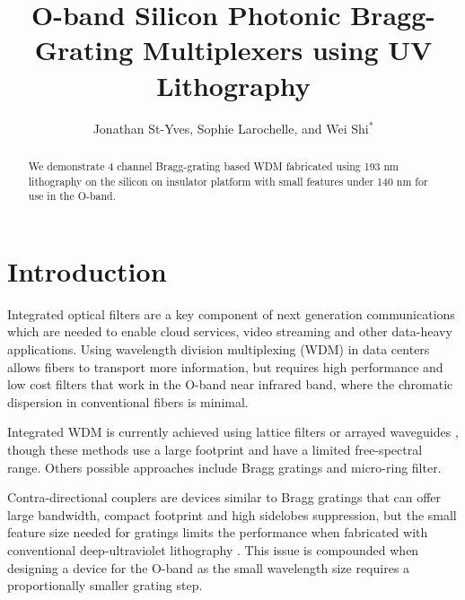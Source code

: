 \documentclass[letterpaper,10pt]{article}
\begin{document}
\title{O-band Silicon Photonic Bragg-Grating Multiplexers using UV Lithography}




\author{Jonathan St-Yves, Sophie Larochelle, and Wei Shi$^*$}
\address{Centre d'optique, photonique et laser (COPL) and Département de génie électrique, Université Laval, 2375 rue de la Terrasse, Québec (Québec), Canada, G1V 0A6}



\begin{abstract}
We demonstrate 4 channel Bragg-grating based WDM fabricated using 193 nm lithography on the silicon on insulator platform with small features under 140 nm for use in the O-band.
\end{abstract}



\maketitle


\section{Introduction}
Integrated optical filters are a key component of next generation communications which are needed to enable cloud services, video streaming and other data-heavy applications. Using wavelength division multiplexing (WDM) in data centers allows fibers to transport more information, but requires high performance and low cost filters that work in the O-band near infrared band, where the chromatic dispersion in conventional fibers is minimal.

Integrated WDM is currently achieved using lattice filters\cite{horst2013cascaded} or arrayed waveguides \cite{okamoto2013fabrication}, though these methods use a large footprint and have a limited free-spectral range. Others possible approaches include Bragg gratings\cite{simard2012apodized} and micro-ring filter\cite{xu2006cascaded}.

Contra-directional couplers\cite{shi2013siliconContraDC} are devices similar to Bragg gratings that can offer large bandwidth, compact footprint and high sidelobes suppression, but the small feature size needed for gratings limits the performance when fabricated with conventional deep-ultraviolet lithography \cite{shi2013ultra}\cite{shi2013coupler}. This issue is compounded when designing a device for the O-band as the small wavelength size requires a proportionally smaller grating step.
\end{document}
